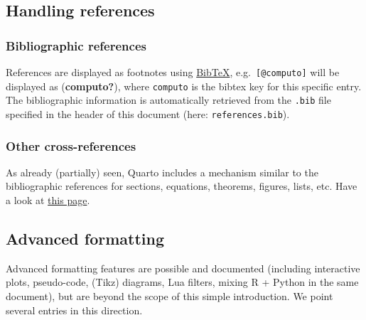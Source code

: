 \documentclass[
  11pt,
  a4paper,
]{article}
\theoremstyle{plain}
\theoremstyle{remark}
\begin{document}
\subsection{Handling references}\label{sec-references}

\subsubsection{Bibliographic references}\label{bibliographic-references}

References are displayed as footnotes using
\href{http://www.bibtex.org/}{BibTeX}, e.g.~\texttt{{[}@computo{]}} will
be displayed as (\textbf{computo?}), where \texttt{computo} is the
bibtex key for this specific entry. The bibliographic information is
automatically retrieved from the \texttt{.bib} file specified in the
header of this document (here: \texttt{references.bib}).

\subsubsection{Other cross-references}\label{other-cross-references}

As already (partially) seen, Quarto includes a mechanism similar to the
bibliographic references for sections, equations, theorems, figures,
lists, etc. Have a look at
\href{https://quarto.org/docs/authoring/cross-references.html}{this
page}.

\subsection{Advanced formatting}\label{advanced-formatting}

Advanced formatting features are possible and documented (including
interactive plots, pseudo-code, (Tikz) diagrams, Lua filters, mixing R +
Python in the same document), but are beyond the scope of this simple
introduction. We point several entries in this direction.
\end{document}
